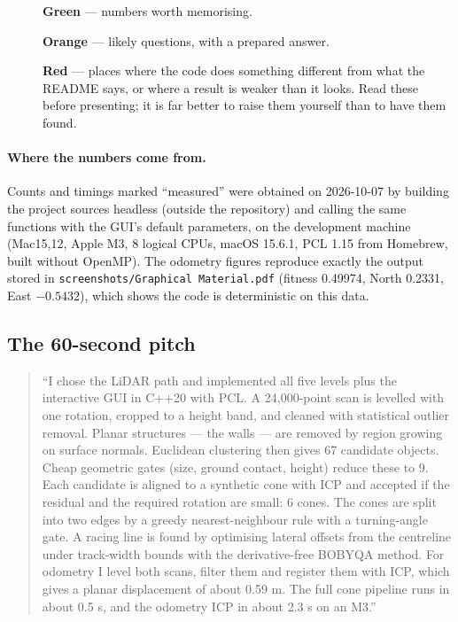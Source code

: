 \documentclass[10pt,a4paper]{scrartcl}
\renewcommand{\emph}[1]{\textcolor{accent}{#1}}
\newcommand{\file}[1]{\texttt{\small #1}}
\begin{document}
  \begin{description}
    \item[] \textbf{\textcolor{accent}{Green}} --- numbers worth memorising.
    \item[] \textbf{\textcolor{orange!75!black}{Orange}} --- likely questions, with a prepared answer.
    \item[] \textbf{\textcolor{BrickRed}{Red}} --- places where the code does something
      different from what the README says, or where a result is weaker than it looks.
      Read these before presenting; it is far better to raise them yourself than to
      have them found.
  \end{description}

  \paragraph{Where the numbers come from.}
  Counts and timings marked ``measured'' were obtained on 2026-10-07 by building the
  project sources headless (outside the repository) and calling the same functions
  with the GUI's default parameters, on the development machine (Mac15,12, Apple M3,
  8 logical CPUs, macOS 15.6.1, PCL 1.15 from Homebrew, built without OpenMP).
  The odometry figures reproduce \emph{exactly} the output stored in
  \file{screenshots/Graphical Material.pdf} (fitness 0.49974,
  North 0.2331, East $-0.5432$), which shows the code is deterministic on this data.

  \subsection{The 60-second pitch}

  \begin{quote}
  \small
  ``I chose the LiDAR path and implemented all five levels plus the interactive GUI in
  C++20 with PCL. A 24,000-point scan is levelled with one rotation, cropped to a
  height band, and cleaned with statistical outlier removal. Planar structures --- the
  walls --- are removed by region growing on surface normals. Euclidean clustering
  then gives 67 candidate objects. Cheap geometric gates (size, ground contact,
  height) reduce these to 9. Each candidate is aligned to a synthetic cone with ICP and
  accepted if the residual and the required rotation are small: 6 cones. The cones are
  split into two edges by a greedy nearest-neighbour rule with a turning-angle gate.
  A racing line is found by optimising lateral offsets from the centreline under
  track-width bounds with the derivative-free BOBYQA method. For odometry I level both
  scans, filter them and register them with ICP, which gives a planar displacement of
  about 0.59 m. The full cone pipeline runs in about 0.5 s, and the odometry ICP in
  about 2.3 s on an M3.''
  \end{quote}
\end{document}

